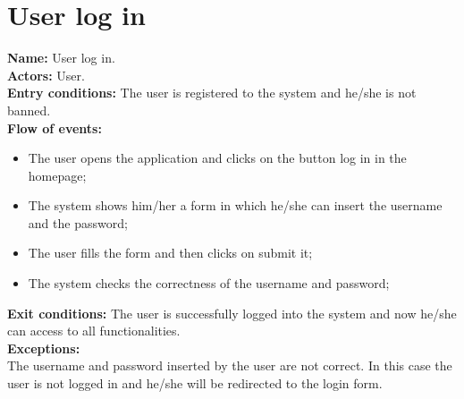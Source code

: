 \section*{User log in} 
\textbf{Name:} User log in.\\
\textbf{Actors:} User.\\
\textbf{Entry conditions:} The user is registered to the system and he/she is not banned.\\
\textbf{Flow of events:}
\begin{itemize}
\item The user opens the application and clicks on the button log in in the homepage;
\item The system shows him/her a form in which he/she can insert the username and the password;
\item The user fills the form and then clicks on submit it;
\item The system checks the correctness of the username and password;
\end{itemize}
\textbf{Exit conditions:} The user is successfully logged into the system and now he/she can access to all functionalities. \\
\textbf{Exceptions:} \\
The username and password inserted by the user are not correct. In this case the user is not logged in and he/she will be redirected to the login form.

